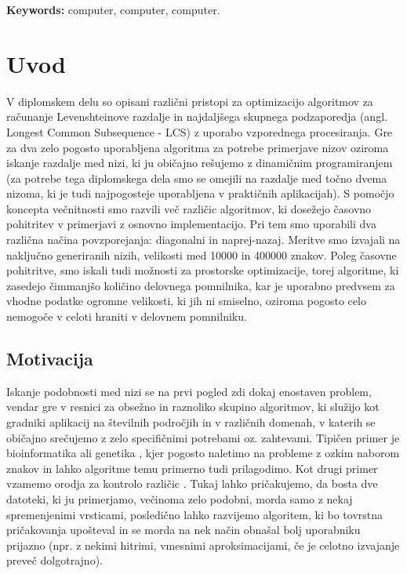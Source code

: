 \documentclass[a4paper,12pt,openright]{book}
\newcommand{\tkeywordsEn}{computer, computer, computer}
\newcommand{\clearemptydoublepage}{\newpage{\pagestyle{empty}\cleardoublepage}}
\begin{document}
\bigskip

\noindent\textbf{Keywords:} \tkeywordsEn.
\clearemptydoublepage

\mainmatter
\setcounter{page}{1}
\pagestyle{fancy}

\chapter{Uvod}

V diplomskem delu so opisani različni pristopi za optimizacijo algoritmov za računanje Levenshteinove razdalje in najdaljšega skupnega podzaporedja (angl. Longest Common Subsequence - LCS) z uporabo vzporednega procesiranja. Gre za dva zelo pogosto uporabljena algoritma za potrebe primerjave nizov oziroma iskanje razdalje med nizi, ki ju običajno rešujemo z dinamičnim programiranjem (za potrebe tega diplomskega dela smo se omejili na razdalje med točno dvema nizoma, ki je tudi najpogosteje uporabljena v praktičnih aplikacijah). S pomočjo koncepta večnitnosti smo razvili več različic algoritmov, ki dosežejo časovno pohitritev v primerjavi z osnovno implementacijo. Pri tem smo uporabili dva različna načina povzporejanja: diagonalni in naprej-nazaj. Meritve smo izvajali na naključno generiranih nizih, velikosti med 10000 in 400000 znakov. Poleg časovne pohitritve, smo iskali tudi možnosti za prostorske optimizacije, torej algoritme, ki zasedejo čimmanjšo količino delovnega pomnilnika, kar je uporabno predvsem za vhodne podatke ogromne velikosti, ki jih ni smiselno, oziroma pogosto celo nemogoče v celoti hraniti v delovnem pomnilniku. 

\section{Motivacija}

Iskanje podobnosti med nizi se na prvi pogled zdi dokaj enostaven problem, vendar gre v resnici za obsežno in raznoliko skupino algoritmov, ki služijo kot gradniki aplikacij na številnih področjih in v različnih domenah, v katerih se običajno srečujemo z zelo specifičnimi potrebami oz. zahtevami. Tipičen primer je bioinformatika ali genetika \cite{LCSpracticalUse}, kjer pogosto naletimo na probleme z ozkim naborom znakov in lahko algoritme temu primerno tudi prilagodimo. Kot drugi primer vzamemo orodja za kontrolo različic \cite{levenshteinMotivation}. Tukaj lahko pričakujemo, da bosta dve datoteki, ki ju primerjamo, večinoma zelo podobni, morda samo z nekaj spremenjenimi vrsticami, posledično lahko razvijemo algoritem, ki bo tovrstna pričakovanja upošteval in se morda na nek način obnašal bolj uporabniku prijazno (npr. z nekimi hitrimi, vmesnimi aproksimacijami, če je celotno izvajanje preveč dolgotrajno). 
\end{document}

